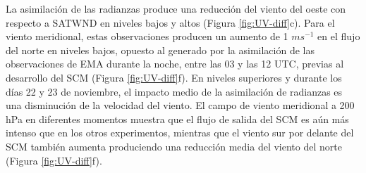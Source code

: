 \documentclass[12pt,oneside,a4paper]{reedthesis}
\begin{document}
La asimilación de las radianzas produce una reducción del viento del oeste con respecto a SATWND en niveles bajos y altos (Figura \ref{fig:UV-diff}c). Para el viento meridional, estas observaciones producen un aumento de 1 \(ms^{-1}\) en el flujo del norte en niveles bajos, opuesto al generado por la asimilación de las observaciones de EMA durante la noche, entre las 03 y las 12 UTC, previas al desarrollo del SCM (Figura \ref{fig:UV-diff}f). En niveles superiores y durante los días 22 y 23 de noviembre, el impacto medio de la asimilación de radianzas es una disminución de la velocidad del viento. El campo de viento meridional a 200 hPa en diferentes momentos muestra que el flujo de salida del SCM es aún más intenso que en los otros experimentos, mientras que el viento sur por delante del SCM también aumenta produciendo una reducción media del viento del norte (Figura \ref{fig:UV-diff}f).
\end{document}
